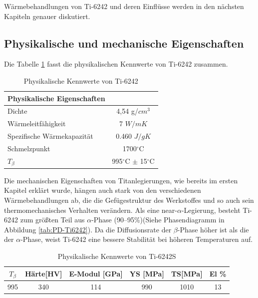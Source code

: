 Wärmebehandlungen von Ti-6242 und deren Einflüsse werden in den nächsten Kapiteln genauer diskutiert.


\subsection{Physikalische und mechanische Eigenschaften}

Die Tabelle \ref{Phy.eig.} fasst die physikalischen Kennwerte von Ti-6242 zusammen.


\begin{table}[H]
	\centering	
	\begin{tabular}{l c}
		
		Physikalische Eigenschaften & \\
		\hline
		Dichte& 4,54 g/$cm^3$\\
		Wärmeleitfähigkeit & 7 $W/mK$ \\
		Spezifische Wärmekapazität & 0.460 $J/gK$\\
		Schmelzpunkt & 1700$^\circ$C \\
		$T_{\beta}$ &  995$^\circ$C $\pm$ 15$^\circ$C \\
		
		\hline
		
	\end{tabular}
	\caption{Physikalische Kennwerte von Ti-6242 \cite{DavidBenjamin.1980,Davis.1990,Holt.1997}}
	\label{Phy.eig.}
\end{table}

\pagebreak

Die mechanischen Eigenschaften von Titanlegierungen, wie bereits im ersten Kapitel erklärt wurde, hängen auch stark von den verschiedenen Wärmebehandlungen ab, die die Gefügestruktur des Werkstoffes und so auch sein thermomechanisches Verhalten verändern.
Als eine near-$\alpha$-Legierung, besteht Ti-6242 zum größten Teil aus $\alpha$-Phase (90--95\%)(Siehe Phasendiagramm in Abbildung \ref{tab:PD-Ti6242}). Da die Diffusionsrate der $\beta$-Phase höher ist als die der $\alpha$-Phase, weist Ti-6242 eine bessere Stabilität bei höheren Temperaturen auf. \cite{Prasad.2017} 

\begin{table}[H]
	\centering	
	\begin{tabular}{|c| c| c| c| c| c|}										
		\hline
		$T_{\beta}$ & Härte[HV] & E-Modul [GPa]& YS [MPa]&TS[MPa]& El \% \\
		\hline
		995&340&114&990&1010&13\\
		\hline
	\end{tabular}
	\caption{Physikalische Kennwerte von Ti-6242S \cite{C.Leyens.2005}}
	\label{Mec.}
\end{table}
	
